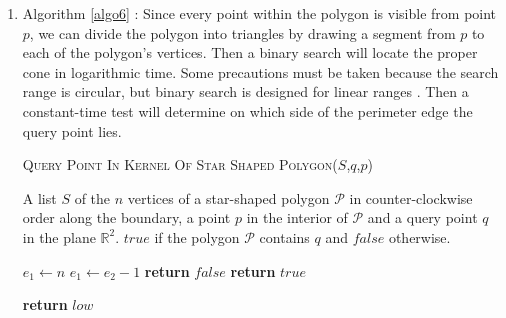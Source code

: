 \documentclass[11pt]{article}
\begin{document}
\begin{enumerate}[1.]
    \item Algorithm \ref{algo6} \cite{hw3}: Since every point within the polygon is visible from point $p$, we can divide the polygon into triangles by drawing a segment from $p$ to each of the polygon's vertices. Then a binary search will locate the proper cone in logarithmic time. Some precautions must be taken because the search range is circular, but binary search is designed for linear ranges \cite{circ}. Then a constant-time test will determine on which side of the perimeter edge the query point lies.
    
     \begin{algorithm}[ht!]
    \caption{\textsc{Query Point In Kernel Of Star Shaped Polygon}($S$,$q$,$p$)}
    \label{algo6}
    \begin{algorithmic}[1]

    \Require A list $S$ of the $n$ vertices of a star-shaped polygon $\mathcal{P}$ in counter-clockwise order along the boundary, a point $p$ in the interior of $\mathcal{P}$ and a query point $q$ in the plane $\mathbb{R}^2$.
    \Ensure $true$ if the polygon $\mathcal{P}$ contains $q$ and $false$ otherwise.
    
     \Comment{Search for the half-line $[pS[e_2]$ that makes the smallest angle with $[pq$ in the counterclockwise order.}
        \State $e_1 \gets n$
    \Else
        \State $e_1 \gets e_2-1$
    \EndIf
        \State \textbf{return} $false$
    \Else
        \State \textbf{return} $true$
    \EndIf {}
    
            \State \textbf{return} $low$
        \EndIf {}
         
        \EndIf {}
        \EndIf {}
        \Else
        \EndIf {}
    \EndFunction
    \end{algorithmic}
    \end{algorithm}
    

\end{enumerate}
\end{document}
